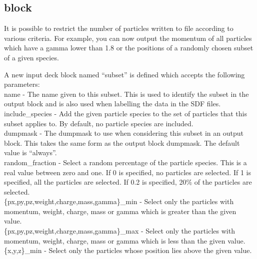 \subsection{\texorpdfstring
  { block}
  {           {subset} block}}
\label{sec:subset_block}

It is possible to restrict the number of particles written to file
according to various criteria. For example, you can now output the
momentum of all particles which have a gamma lower than 1.8 or the
positions of a randomly chosen subset of a given species.

A new input deck block named ``subset'' is defined which accepts the following
parameters:\\

{\emphtext name} - The name given to this subset. This is used to identify the
  subset in the output block and is also used when labelling the data in the
  SDF files.\\

{\emphtext include\_species} - Add the given particle species to the set of
  particles that this subset applies to. By default, no particle species
  are included.\\

{\emphtext dumpmask} - The dumpmask to use when considering this subset in
  an output block. This takes the same form as the output block dumpmask.
  The default value is ``always''.\\

{\emphtext random\_fraction} - Select a random percentage of the particle
  species. This is a real value between zero and one. If 0 is specified,
  no particles are selected. If 1 is specified, all the particles are
  selected. If 0.2 is specified, 20\% of the particles are selected.\\

{\emphtext \{px,py,pz,weight,charge,mass,gamma\}\_min} - Select only the
  particles with momentum, weight, charge, mass or gamma which is greater
  than the given value.\\

{\emphtext \{px,py,pz,weight,charge,mass,gamma\}\_max} - Select only the
  particles with momentum, weight, charge, mass or gamma which is less
  than the given value.\\

{\emphtext \{x,y,z\}\_min} - Select only the particles whose position lies
  above the given value.\\

